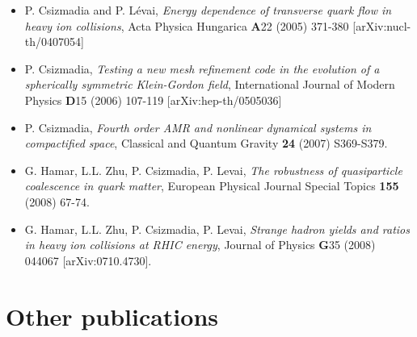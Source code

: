 \documentclass{article}[12pt]
\begin{document}
\begin{itemize}
\item P. Csizmadia and P. L{\'e}vai, {\it Energy dependence of transverse
      quark flow in heavy ion collisions},
      Acta Physica Hungarica {\bf A}22 (2005) 371-380 [arXiv:nucl-th/0407054]

\item P. Csizmadia, {\it Testing a new mesh refinement code in the evolution
      of a spherically symmetric Klein-Gordon field},
      International Journal of Modern Physics {\bf D}15 (2006) 107-119
      [arXiv:hep-th/0505036]

\item P. Csizmadia, {\it  Fourth order AMR and nonlinear dynamical systems
      in compactified space},
      Classical and Quantum Gravity {\bf 24} (2007) S369-S379.

\item G. Hamar, L.L. Zhu, P. Csizmadia, P. Levai, {\it The robustness of
      quasiparticle coalescence in quark matter},
      European Physical Journal Special Topics {\bf 155} (2008) 67-74.

\item G. Hamar, L.L. Zhu, P. Csizmadia, P. Levai, {\it Strange hadron yields
      and ratios in heavy ion collisions at RHIC energy},
      Journal of Physics {\bf G}35 (2008) 044067
      [arXiv:0710.4730].

\end{itemize}

\section*{Other publications}
\end{document}
